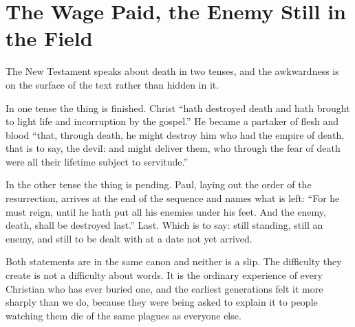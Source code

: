 \section{The Wage Paid, the Enemy Still in the Field}

The New Testament speaks about death in two tenses, and the awkwardness is on the surface of the text rather than hidden in it.

In one tense the thing is finished. Christ ``hath destroyed death and hath brought to light life and incorruption by the gospel.'' He became a partaker of flesh and blood ``that, through death, he might destroy him who had the empire of death, that is to say, the devil: and might deliver them, who through the fear of death were all their lifetime subject to servitude.''

In the other tense the thing is pending. Paul, laying out the order of the resurrection, arrives at the end of the sequence and names what is left: ``For he must reign, until he hath put all his enemies under his feet. And the enemy, death, shall be destroyed last.'' Last. Which is to say: still standing, still an enemy, and still to be dealt with at a date not yet arrived.

Both statements are in the same canon and neither is a slip. The difficulty they create is not a difficulty about words. It is the ordinary experience of every Christian who has ever buried one, and the earliest generations felt it more sharply than we do, because they were being asked to explain it to people watching them die of the same plagues as everyone else.

